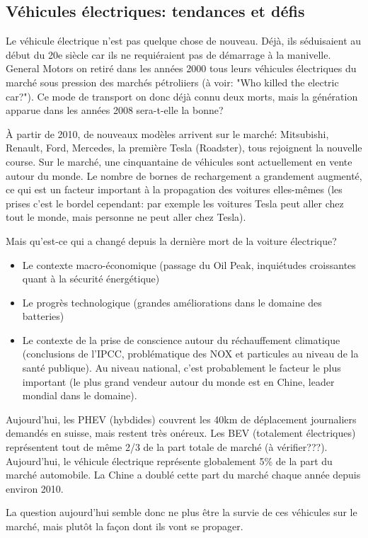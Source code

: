 \documentclass{article}
\begin{document}
\subsection{Véhicules électriques: tendances et défis}
Le véhicule électrique n'est pas quelque chose de nouveau. Déjà, ils séduisaient au début du 20e siècle car ils ne requiéraient pas de démarrage à la manivelle. General Motors on retiré dans les années 2000 tous leurs véhicules électriques du marché sous pression des marchés pétroliiers (à voir: "Who killed the electric car?"). Ce mode de transport on donc déjà connu deux morts, mais la génération apparue dans les années 2008 sera-t-elle la bonne? \par
À partir de 2010, de nouveaux modèles arrivent sur le marché: Mitsubishi, Renault, Ford, Mercedes, la première Tesla (Roadster), tous rejoignent la nouvelle course. Sur le marché, une cinquantaine de véhicules sont actuellement en vente autour du monde. Le nombre de bornes de rechargement a grandement augmenté, ce qui est un facteur important à la propagation des voitures elles-mêmes (les prises c'est le bordel cependant: par exemple les voitures Tesla peut aller chez tout le monde, mais personne ne peut aller chez Tesla). \par
 Mais qu'est-ce qui a changé depuis la dernière mort de la voiture électrique? 
\begin{itemize}
	\item Le contexte macro-économique (passage du Oil Peak, inquiétudes croissantes quant à la sécurité énergétique)
	\item Le progrès technologique (grandes améliorations dans le domaine des batteries)
	\item Le contexte de la prise de conscience autour du réchauffement climatique (conclusions de l'IPCC, problématique des NOX et particules au niveau de la santé publique). Au niveau national, c'est probablement le facteur le plus important (le plus grand vendeur autour du monde est en Chine, leader mondial dans le domaine).
\end{itemize}
 Aujourd'hui, les PHEV (hybdides) couvrent les 40km de déplacement journaliers demandés en suisse, mais restent très onéreux. Les BEV (totalement électriques) représentent tout de même 2/3 de la part totale de marché (à vérifier???). Aujourd'hui, le véhicule électrique représente globalement 5\% de la part du marché automobile. La Chine a doublé cette part du marché chaque année depuis environ 2010. \par
 La question aujourd'hui semble donc ne plus être la survie de ces véhicules sur le marché, mais plutôt la façon dont ils vont se propager. 
\end{document}
